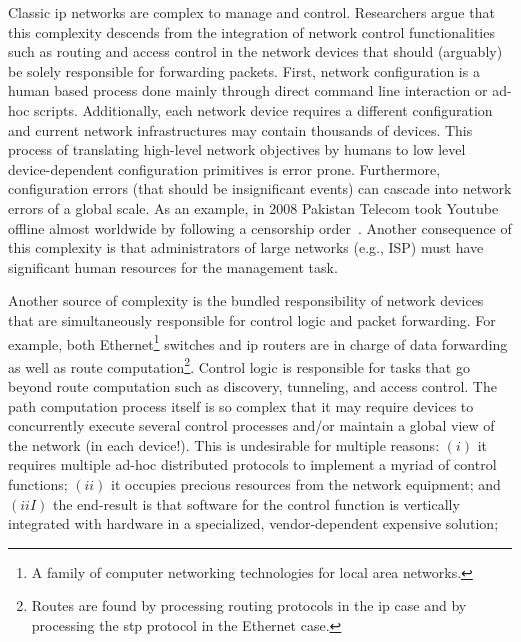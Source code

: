 
Classic \gls{ip} networks are complex to manage and control. 
Researchers argue that this complexity descends from the integration of network control functionalities such as routing and access control 
in the network devices that should (arguably) be solely responsible for forwarding packets. 
First, network configuration is a human based process done mainly through direct command line interaction or ad-hoc scripts. 
Additionally, each network device requires a different configuration and current network infrastructures may contain thousands of devices. 
This process of translating high-level network objectives by humans to low level device-dependent configuration primitives is error prone. Furthermore, configuration errors (that should be insignificant events) can cascade into network errors of a global scale. 
As an example, in 2008 Pakistan Telecom took Youtube offline almost worldwide by following a censorship order~\cite{McCullagh:2008fk}.
Another consequence of this complexity is that administrators of large networks (e.g., ISP)  must have significant human resources for the management task.  

Another source of complexity is the bundled responsibility  of network devices that are simultaneously responsible for control logic and packet forwarding. 
For example, both Ethernet\footnote{A family of computer networking technologies for local area networks.}  switches and \gls{ip} routers are in charge of  data forwarding as well as route computation\footnote{Routes are found by processing routing protocols in the \gls{ip} case and by processing the \gls{stp} protocol in the Ethernet case.}. 
Control logic is responsible for  tasks that go beyond route computation such as  discovery, tunneling, and  access control. 
The path computation process itself is so complex that it may require devices to concurrently execute several control processes and/or maintain a global view of the network (in each device!).  
This is undesirable for multiple reasons: $(i)$ it requires multiple ad-hoc distributed protocols to implement a myriad of control functions; $(ii)$ it occupies precious resources from the network equipment; and $(iiI)$ the end-result is that software for the control function is vertically integrated with hardware in a specialized, vendor-dependent expensive solution;  



